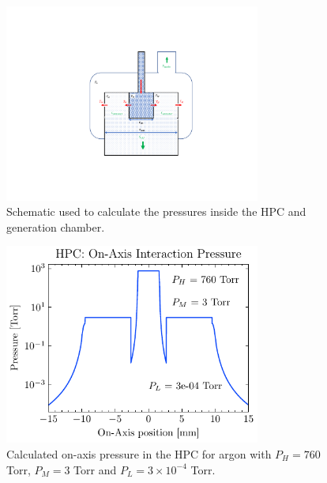 \begin{figure}
	\centering
	\includegraphics[width=0.75\textwidth]{figures/chap3/HPC_pressure_schematic.pdf}
	\caption{Schematic used to calculate the pressures inside the HPC and generation chamber.}
	\label{fig:HPC_pressure_schematic}
\end{figure}

\begin{figure}
	\centering
	\includegraphics[width=0.75\textwidth]{figures/chap3/HPC_on-axis-pressure.pdf}
	\caption{Calculated on-axis pressure in the HPC for argon with $P_H = 760$ Torr, $P_M = 3$ Torr and $P_L = 3 \times 10^{-4}$ Torr.}
	\label{fig:HPC_on-axis-pressure}
\end{figure}

